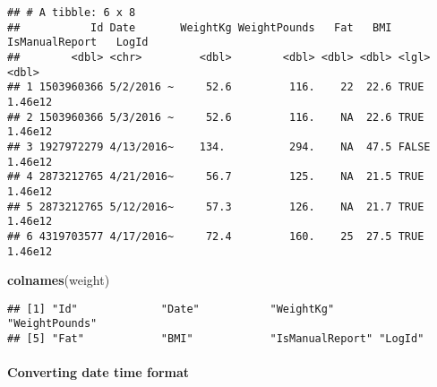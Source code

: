 \documentclass[
]{article}
\newenvironment{Shaded}{\begin{snugshade}}{\end{snugshade}}
\newcommand{\FunctionTok}[1]{\textcolor[rgb]{0.13,0.29,0.53}{\textbf{#1}}}
\newcommand{\NormalTok}[1]{#1}
\begin{document}
\begin{verbatim}
## # A tibble: 6 x 8
##           Id Date       WeightKg WeightPounds   Fat   BMI IsManualReport   LogId
##        <dbl> <chr>         <dbl>        <dbl> <dbl> <dbl> <lgl>            <dbl>
## 1 1503960366 5/2/2016 ~     52.6         116.    22  22.6 TRUE           1.46e12
## 2 1503960366 5/3/2016 ~     52.6         116.    NA  22.6 TRUE           1.46e12
## 3 1927972279 4/13/2016~    134.          294.    NA  47.5 FALSE          1.46e12
## 4 2873212765 4/21/2016~     56.7         125.    NA  21.5 TRUE           1.46e12
## 5 2873212765 5/12/2016~     57.3         126.    NA  21.7 TRUE           1.46e12
## 6 4319703577 4/17/2016~     72.4         160.    25  27.5 TRUE           1.46e12
\end{verbatim}

\begin{Shaded}
\begin{Highlighting}[]
\FunctionTok{colnames}\NormalTok{(weight)}
\end{Highlighting}
\end{Shaded}

\begin{verbatim}
## [1] "Id"             "Date"           "WeightKg"       "WeightPounds"  
## [5] "Fat"            "BMI"            "IsManualReport" "LogId"
\end{verbatim}

\hypertarget{converting-date-time-format}{%
\paragraph{Converting date time
format}\label{converting-date-time-format}}
\end{document}
